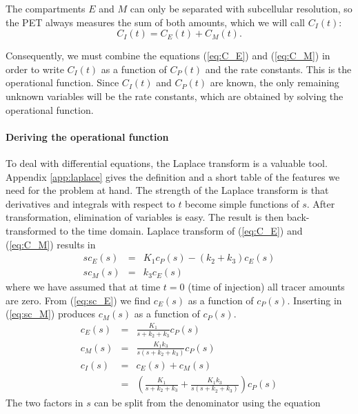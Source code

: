 The compartments $E$ and $M$ can only be separated with subcellular
resolution, so the PET always measures the sum of both amounts, which we will
call $C_I(t)$:
\begin{equation}
  C_I(t) = C_E(t) + C_M(t).
\end{equation}

Consequently, we must combine the equations (\ref{eq:C_E}) and (\ref{eq:C_M})
in order to write $C_I(t)$ as a function of $C_P(t)$ and the rate
constants. This is the operational function. Since $C_I(t)$ and $C_P(t)$ are
known, the only remaining unknown variables will be the rate constants, which
are obtained by solving the operational function.

\paragraph{Deriving the operational function\\}
To deal with differential equations, the Laplace transform is a valuable
tool. Appendix \ref{app:laplace} gives the definition and a short table of the
features we need for the problem at hand. The strength of the Laplace
transform is that derivatives and integrals with respect to $t$ become simple
functions of $s$. After transformation, elimination of variables is easy. The
result is then back-transformed to the time domain.  Laplace transform of
(\ref{eq:C_E}) and (\ref{eq:C_M}) results in
\begin{align}
  s c_E(s) & = & K_1 c_P(s) - (k_2 + k_3) c_E(s) \label{eq:sc_E}\\
  s c_M(s) & = & k_3 c_E(s)  \label{eq:sc_M}
\end{align}
where we have assumed that at time $t=0$ (time of injection) all tracer
amounts are zero.  From (\ref{eq:sc_E}) we find $c_E(s)$ as a function of
$c_P(s)$. Inserting in (\ref{eq:sc_M}) produces $c_M(s)$ as a function of
$c_P(s)$.
\begin{align}
  c_E(s) & = & \frac{K_1}{s + k_2 + k_3} c_P(s)\\
  c_M(s) & = & \frac{K_1 k_3}{s (s + k_2 + k_3)} c_P(s)\\
  c_I(s) & = & c_E(s) + c_M(s) \\
         & = & \left( \frac{K_1}{s + k_2 + k_3} 
                    + \frac{K_1 k_3}{s (s + k_2 + k_3)}\right) c_P(s)
           \label{eq:c_I}
\end{align}
The two factors in $s$ can be split from the denominator using the equation

